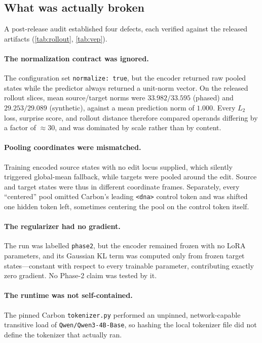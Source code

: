 \documentclass{article}
\begin{document}
\subsection{What was actually broken}

A post-release audit established four defects, each verified against the released artifacts
(\cref{tab:rollout}, \cref{tab:vep}).

\paragraph{The normalization contract was ignored.} The configuration set \texttt{normalize: true},
but the encoder returned raw pooled states while the predictor always returned a unit-norm vector.
On the released rollout slices, mean source/target norms were $33.982/33.595$ (phased) and
$29.253/29.089$ (synthetic), against a mean prediction norm of $1.000$. Every $L_2$ loss, surprise
score, and rollout distance therefore compared operands differing by a factor of $\approx30$, and
was dominated by scale rather than by content.

\paragraph{Pooling coordinates were mismatched.} Training encoded source states with no edit locus
supplied, which silently triggered global-mean fallback, while targets were pooled around the edit.
Source and target states were thus in different coordinate frames. Separately, every ``centered''
pool omitted Carbon's leading \texttt{<dna>} control token and was shifted one hidden token left,
sometimes centering the pool on the control token itself.

\paragraph{The regularizer had no gradient.} The run was labelled \texttt{phase2}, but the encoder
remained frozen with no LoRA parameters, and its Gaussian KL term was computed only from frozen
target states---constant with respect to every trainable parameter, contributing exactly zero
gradient. No Phase-2 claim was tested by it.

\paragraph{The runtime was not self-contained.} The pinned Carbon \texttt{tokenizer.py} performed an
unpinned, network-capable transitive load of \texttt{Qwen/Qwen3-4B-Base}, so hashing the local
tokenizer file did not define the tokenizer that actually ran.
\end{document}
